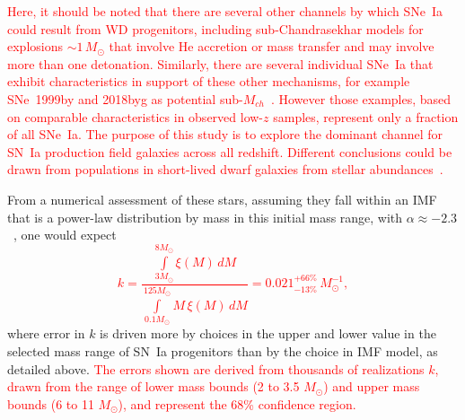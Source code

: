 \documentclass[apj, linenumbers]{aastex62}
\begin{document}
\textcolor{red}{Here, it should be noted that there are several other channels by which SNe~Ia could result from WD progenitors, including sub-Chandrasekhar models for explosions $\sim1\,M_{\odot}$ that involve He accretion or mass transfer and may involve more than one detonation. Similarly, there are several individual SNe~Ia that exhibit characteristics in support of these other mechanisms, for example SNe~1999by and 2018byg as potential sub-$M_{ch}$~\citep{Blondin:2018wn,De:2019rv}. However those examples, based on comparable characteristics in observed low-$z$ samples, represent only a fraction of all SNe~Ia. The purpose of this study is to explore the dominant channel for SN~Ia production field galaxies across all redshift. Different conclusions could be drawn from populations in short-lived dwarf galaxies from stellar abundances~\citep{Kirby:2019aa}.}

From a numerical assessment of these stars, assuming they fall within an IMF that is a power-law distribution by mass in this initial mass range, with $\alpha\approx-2.3$~\citep{Salpeter:1955rw,Kroupa:2001gf}, one would expect \textcolor{red}{ 
\begin{equation}
k = \frac{\int\limits_{3M_{\odot}}^{8M_{\odot}} \xi(M)\,dM}{\int\limits_{0.1M_{\odot}}^{125M_{\odot}} M\,\xi(M)\,dM}= 0.021^{+66\%}_{-13\%}\,M_{\odot}^{-1},
\label{eqn:k}
\end{equation}}
\noindent where error in $k$ is driven more by choices in the upper and lower value in the selected mass range of SN~Ia progenitors than by the choice in IMF model, as detailed above. \textcolor{red}{The errors shown are derived from thousands of realizations $k$, drawn from the range of lower mass bounds (2 to 3.5 $M_{\odot}$) and upper mass bounds (6 to 11 $M_{\odot}$), and represent the 68\% confidence region.} 
\end{document}
